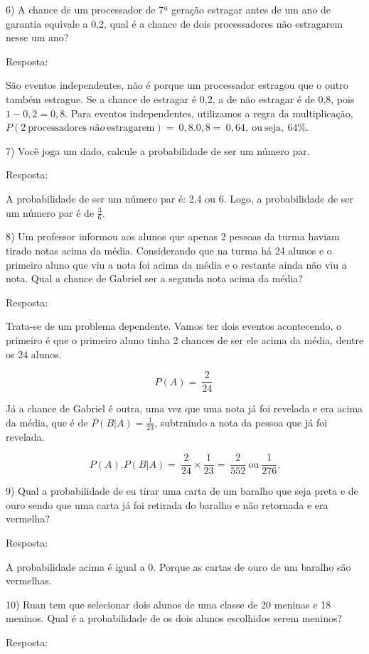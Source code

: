 6) A chance de um processador de 7ª geração estragar antes de um ano de
garantia equivale a 0,2, qual é a chance de dois processadores não
estragarem nesse um ano?

Resposta:

São eventos independentes, não é porque um processador estragou que o
outro também estrague. Se a chance de estragar é 0,2, a de não estragar
é de 0,8, pois \(1 - 0,2 = 0,8\). Para eventos independentes, utilizamos
a regra da multiplicação,
\(P(2\ \text{processad}\text{ores}\ não\ \text{estragarem}) = \ 0,8.0,8 = \ 0,64,\ \text{ou}\ \text{seja},\ 64\%.\)

7) Você joga um dado, calcule a probabilidade de ser um número par.

Resposta:

A probabilidade de ser um número par é: 2,4 ou 6. Logo, a probabilidade
de ser um número par é de \(\frac{3}{6}\).

8) Um professor informou aos alunos que apenas 2 pessoas da turma haviam
tirado notas acima da média. Considerando que na turma há 24 alunos e o
primeiro aluno que viu a nota foi acima da média e o restante ainda não
viu a nota. Qual a chance de Gabriel ser a segunda nota acima da média?

Resposta:

Trata-se de um problema dependente. Vamos ter dois eventos acontecendo,
o primeiro é que o primeiro aluno tinha 2 chances de ser ele acima da
média, dentre os 24 alunos.

\[P(A) = \ \frac{2}{24}\ \]

Já a chance de Gabriel é outra, uma vez que uma nota já foi revelada e
era acima da média, que é de \(P(B|A) = \frac{1}{23}\), subtraindo a
nota da pessoa que já foi revelada.

\[P(A).P(B|A) = \ \frac{2}{24} \times \frac{1}{23} = \ \frac{2}{552}\ \text{ou}\ \frac{1}{276}.\]

9) Qual a probabilidade de eu tirar uma carta de um baralho que seja
preta e de ouro sendo que uma carta já foi retirada do baralho e não
retornada e era vermelha?

Resposta:

A probabilidade acima é igual a 0. Porque as cartas de ouro de um
baralho são vermelhas.

10) Ruan tem que selecionar dois alunos de uma classe de 20 meninas e 18
meninos. Qual é a probabilidade de os dois alunos escolhidos serem
meninos?

Resposta:

